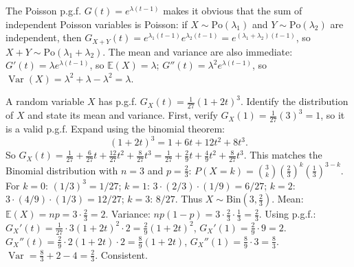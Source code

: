 \documentclass[11pt]{article}
\newcounter{popsec}
\newcounter{popsub}
\newcommand{\courssub}[1]{%
  \stepcounter{popsub}%
  \par\vspace{9pt}\noindent{\popxbold\fontsize{11.5}{13}\selectfont\color{popink}{\color{poporange}\thepopsec.\thepopsub}\hspace{6pt}#1}\par\nopagebreak\vspace{4pt}
}
\begin{document}
\begin{savaistu}
The Poisson p.g.f. $G(t)=e^{\lambda(t-1)}$ makes it obvious that the sum of independent Poisson variables is Poisson: if $X\sim\mathrm{Po}(\lambda_1)$ and $Y\sim\mathrm{Po}(\lambda_2)$ are independent, then $G_{X+Y}(t)=e^{\lambda_1(t-1)}e^{\lambda_2(t-1)}=e^{(\lambda_1+\lambda_2)(t-1)}$, so $X+Y\sim\mathrm{Po}(\lambda_1+\lambda_2)$. The mean and variance are also immediate: $G'(t)=\lambda e^{\lambda(t-1)}$, so $\mathbb{E}(X)=\lambda$; $G''(t)=\lambda^2 e^{\lambda(t-1)}$, so $\operatorname{Var}(X)=\lambda^2+\lambda-\lambda^2=\lambda$.
\end{savaistu}

\begin{exoresolu}
A random variable $X$ has p.g.f. $G_X(t) = \frac{1}{27}(1+2t)^3$. Identify the distribution of $X$ and state its mean and variance.
\tcblower
First, verify $G_X(1)=\frac{1}{27}(3)^3=1$, so it is a valid p.g.f.
Expand using the binomial theorem:
\[
(1+2t)^3 = 1 + 6t + 12t^2 + 8t^3.
\]
So $G_X(t) = \frac{1}{27} + \frac{6}{27}t + \frac{12}{27}t^2 + \frac{8}{27}t^3 = \frac{1}{27} + \frac{2}{9}t + \frac{4}{9}t^2 + \frac{8}{27}t^3$.
This matches the Binomial distribution with $n=3$ and $p=\frac{2}{3}$:
$P(X=k)=\binom{3}{k}\left(\frac{2}{3}\right)^k\left(\frac{1}{3}\right)^{3-k}$.
For $k=0$: $(1/3)^3=1/27$; $k=1$: $3\cdot(2/3)\cdot(1/9)=6/27$; $k=2$: $3\cdot(4/9)\cdot(1/3)=12/27$; $k=3$: $8/27$.
Thus $X\sim \mathrm{Bin}(3,\frac{2}{3})$.
Mean: $\mathbb{E}(X)=np=3\cdot\frac{2}{3}=2$. Variance: $np(1-p)=3\cdot\frac{2}{3}\cdot\frac{1}{3}=\frac{2}{3}$.
Using p.g.f.: $G_X'(t)=\frac{1}{27}\cdot 3(1+2t)^2\cdot 2 = \frac{2}{9}(1+2t)^2$, $G_X'(1)=\frac{2}{9}\cdot 9=2$. $G_X''(t)=\frac{2}{9}\cdot 2(1+2t)\cdot 2 = \frac{8}{9}(1+2t)$, $G_X''(1)=\frac{8}{9}\cdot 3=\frac{8}{3}$. $\operatorname{Var}= \frac{8}{3}+2-4=\frac{2}{3}$. Consistent.
\end{exoresolu}

\courssub{Illustrations}
\end{document}
